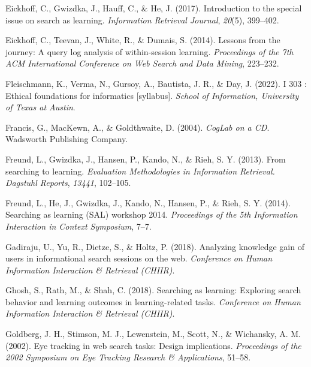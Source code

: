 \documentclass[letterpaper, nobind]{templates/ociamthesis}
\newlength{\cslhangindent}
\newenvironment{CSLReferences}[2] %
 {%
  \setlength{\parindent}{0pt}
  \ifodd #1
  \let\oldpar\par
  \def\par{\hangindent=\cslhangindent\oldpar}
  \fi
  \setlength{\parskip}{1mm}
  \setlength{\baselineskip}{6mm}
 }%
 {}
\begin{document}
\begin{CSLReferences}{1}{0}
\leavevmode{}%
Eickhoff, C., Gwizdka, J., Hauff, C., \& He, J. (2017). Introduction to the special issue on search as learning. \emph{Information Retrieval Journal}, \emph{20}(5), 399--402.

\leavevmode{}%
Eickhoff, C., Teevan, J., White, R., \& Dumais, S. (2014). Lessons from the journey: A query log analysis of within-session learning. \emph{Proceedings of the 7th ACM International Conference on Web Search and Data Mining}, 223--232.

\leavevmode{}%
Fleischmann, K., Verma, N., Gursoy, A., Bautista, J. R., \& Day, J. (2022). I 303 : Ethical foundations for informatics {[}syllabus{]}. \emph{School of Information, University of Texas at Austin}.

\leavevmode{}%
Francis, G., MacKewn, A., \& Goldthwaite, D. (2004). \emph{{CogLab} on a {CD}}. {Wadsworth Publishing Company}.

\leavevmode{}%
Freund, L., Gwizdka, J., Hansen, P., Kando, N., \& Rieh, S. Y. (2013). From searching to learning. \emph{Evaluation Methodologies in Information Retrieval. Dagstuhl Reports}, \emph{13441}, 102--105.

\leavevmode{}%
Freund, L., He, J., Gwizdka, J., Kando, N., Hansen, P., \& Rieh, S. Y. (2014). Searching as learning (SAL) workshop 2014. \emph{Proceedings of the 5th Information Interaction in Context Symposium}, 7--7.

\leavevmode{}%
Gadiraju, U., Yu, R., Dietze, S., \& Holtz, P. (2018). Analyzing knowledge gain of users in informational search sessions on the web. \emph{Conference on Human Information Interaction \& Retrieval (CHIIR)}.

\leavevmode{}%
Ghosh, S., Rath, M., \& Shah, C. (2018). Searching as learning: Exploring search behavior and learning outcomes in learning-related tasks. \emph{Conference on Human Information Interaction \& Retrieval (CHIIR)}.

\leavevmode{}%
Goldberg, J. H., Stimson, M. J., Lewenstein, M., Scott, N., \& Wichansky, A. M. (2002). Eye tracking in web search tasks: Design implications. \emph{Proceedings of the 2002 Symposium on Eye Tracking Research \& Applications}, 51--58.


\end{CSLReferences}
\end{document}
